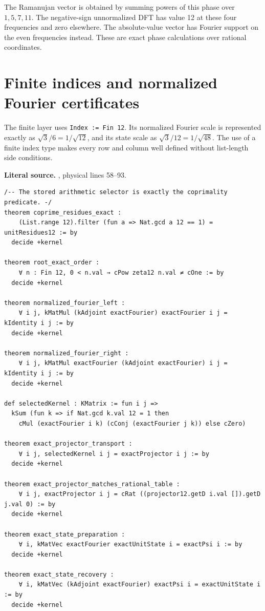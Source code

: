 The Ramanujan vector is obtained by summing powers of this phase over
\(1,5,7,11\). The negative-sign unnormalized DFT has value 12 at these four
frequencies and zero elsewhere. The absolute-value vector has Fourier support
on the even frequencies instead. These are exact phase calculations over
rational coordinates.

\section{Finite indices and normalized Fourier certificates}
The finite layer uses \texttt{Index := Fin 12}. Its normalized Fourier scale is
represented exactly as \(\sqrt3/6=1/\sqrt{12}\), and its state scale as
\(\sqrt3/12=1/\sqrt{48}\). The use of a finite index type makes every row and
column well defined without list-length side conditions.

\noindent\textbf{Literal source.} \texttt{}, physical lines 58--93.

\begin{Verbatim}[breaklines=true,breakanywhere=true,fontsize=\footnotesize]
/-- The stored arithmetic selector is exactly the coprimality predicate. -/
theorem coprime_residues_exact :
    (List.range 12).filter (fun a => Nat.gcd a 12 == 1) = unitResidues12 := by
  decide +kernel

theorem root_exact_order :
    ∀ n : Fin 12, 0 < n.val → cPow zeta12 n.val ≠ cOne := by
  decide +kernel

theorem normalized_fourier_left :
    ∀ i j, kMatMul (kAdjoint exactFourier) exactFourier i j = kIdentity i j := by
  decide +kernel

theorem normalized_fourier_right :
    ∀ i j, kMatMul exactFourier (kAdjoint exactFourier) i j = kIdentity i j := by
  decide +kernel

def selectedKernel : KMatrix := fun i j =>
  kSum (fun k => if Nat.gcd k.val 12 = 1 then
    cMul (exactFourier i k) (cConj (exactFourier j k)) else cZero)

theorem exact_projector_transport :
    ∀ i j, selectedKernel i j = exactProjector i j := by
  decide +kernel

theorem exact_projector_matches_rational_table :
    ∀ i j, exactProjector i j = cRat ((projector12.getD i.val []).getD j.val 0) := by
  decide +kernel

theorem exact_state_preparation :
    ∀ i, kMatVec exactFourier exactUnitState i = exactPsi i := by
  decide +kernel

theorem exact_state_recovery :
    ∀ i, kMatVec (kAdjoint exactFourier) exactPsi i = exactUnitState i := by
  decide +kernel
\end{Verbatim}


